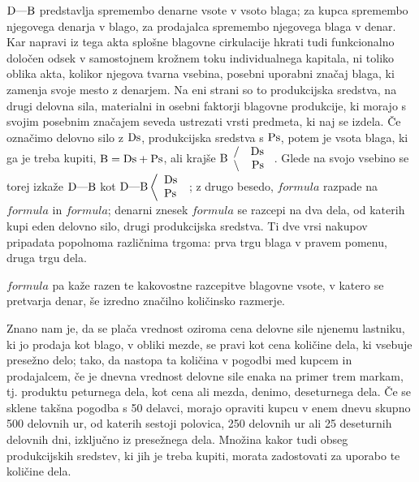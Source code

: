 \documentclass[kapital_02.tex]{subfiles}
\begin{document}
\( \textrm{D}\textrm{---}\textrm{B} \) predstavlja spremembo denarne vsote v vsoto blaga; za kupca spremembo njegovega denarja v blago, za prodajalca spremembo njegovega blaga v denar. Kar napravi iz tega akta splošne blagovne cirkulacije hkrati tudi funkcionalno določen odsek v samostojnem krožnem toku individualnega kapitala, ni toliko oblika akta, kolikor njegova tvarna vsebina, posebni uporabni značaj blaga, ki zamenja svoje mesto z denarjem. Na eni strani so to produkcijska sredstva, na drugi delovna sila, materialni in osebni faktorji blagovne produkcije, ki morajo s svojim posebnim značajem seveda ustrezati vrsti predmeta, ki naj se izdela. Če označimo delovno silo z \( \textrm{Ds} \), produkcijska sredstva s \( \textrm{Ps} \), potem je vsota blaga, ki ga je treba kupiti, \( \textrm{B}=\textrm{Ds}+\textrm{Ps} \), ali krajše 
\( 
    \textrm{B}
    \begin{array}{l r}
        \slash & \textrm{Ds}\\
        \backslash & \textrm{Ps}\\
    \end{array}
\)
. Glede na svojo vsebino se torej izkaže \( \textrm{D}\textrm{---}\textrm{B} \) kot 
\( 
    \textrm{D}\textrm{---}\textrm{B}\left< 
    \begin{array}{l}
        \textrm{Ds}\\
        \textrm{Ps}\\
    \end{array}
    \right. 
\)
; z drugo besedo, \( formula \) razpade na \( formula \) in \( formula \); denarni znesek \( formula \) se razcepi na dva dela, od katerih kupi eden delovno silo, drugi produkcijska sredstva. Ti dve vrsi nakupov pripadata popolnoma različnima trgoma: prva trgu blaga v pravem pomenu, druga trgu dela.

\( formula \) pa kaže razen te kakovostne razcepitve blagovne vsote, v katero se pretvarja denar, še izredno značilno količinsko razmerje.

Znano nam je, da se plača vrednost oziroma cena delovne sile njenemu lastniku, ki jo prodaja kot blago, v obliki mezde, se pravi kot cena količine dela, ki vsebuje presežno delo; tako, da nastopa ta količina v pogodbi med kupcem in prodajalcem, če je dnevna vrednost delovne sile enaka na primer trem markam, tj. produktu peturnega dela, kot cena ali mezda, denimo, deseturnega dela. Če se sklene takšna pogodba s 50 delavci, morajo opraviti kupcu v enem dnevu skupno 500 delovnih ur, od katerih sestoji polovica, 250 delovnih ur ali 25 deseturnih delovnih dni, izključno iz presežnega dela. Množina kakor tudi obseg produkcijskih sredstev, ki jih je treba kupiti, morata zadostovati za uporabo te količine dela.
\end{document}
